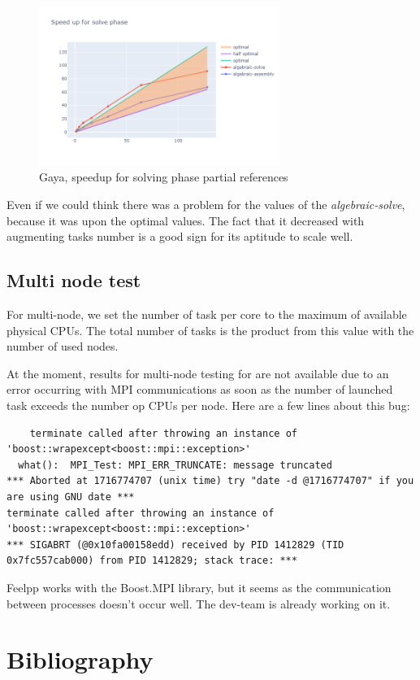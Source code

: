 \documentclass[12pt]{article}
\begin{document}
\begin{figure}[H]
    \centering
    \includegraphics[width=0.7\textwidth]{../illustrations/gaya-graphs/gayaSolve.png}
    \caption{Gaya, speedup for solving phase partial references}
\end{figure}

Even if we could think there was a problem for the values of the \textit{algebraic-solve}, because it was upon the optimal values.
The fact that it decreased with augmenting tasks number is a good sign for its aptitude to scale well.

\subsection{Multi node test}
For multi-node, we set the number of task per core to the maximum of available physical CPUs.
The total number of tasks is the product from this value with the number of used nodes.

At the moment, results for multi-node testing for are not available due to an error occurring with MPI communications as soon as the number of launched task exceeds the number op CPUs per node.
Here are a few lines about this bug:

\begin{scriptsize}
\begin{verbatim}
    terminate called after throwing an instance of 'boost::wrapexcept<boost::mpi::exception>'
  what():  MPI_Test: MPI_ERR_TRUNCATE: message truncated
*** Aborted at 1716774707 (unix time) try "date -d @1716774707" if you are using GNU date ***
terminate called after throwing an instance of 'boost::wrapexcept<boost::mpi::exception>'
*** SIGABRT (@0x10fa00158edd) received by PID 1412829 (TID 0x7fc557cab000) from PID 1412829; stack trace: ***
\end{verbatim}
\end{scriptsize}

Feelpp works with the Boost.MPI library, but it seems as the communication between processes doesn't occur well.
The dev-team is already working on it.

\newpage
\section{Bibliography}
\printbibliography[heading=none]
\end{document}
